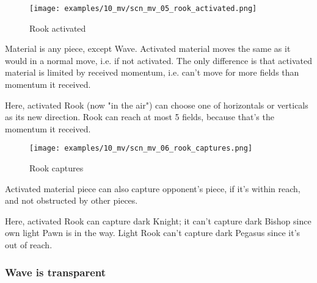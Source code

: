 \clearpage %

\vspace*{-2.1\baselineskip}
\noindent
\begin{figure}[!h]
\texttt{[image: examples/10\_mv/scn\_mv\_05\_rook\_activated.png]}
\vspace*{-1.3\baselineskip}
\caption{Rook activated}
\label{fig:scn_mv_05_rook_activated}
\end{figure}

\vspace*{-0.3\baselineskip}
Material is any piece, except Wave. Activated material moves the same as it would
in a normal move, i.e. if not activated. The only difference is that activated
material is limited by received momentum, i.e. can't move for more fields than
momentum it received.

Here, activated Rook (now "in the air") can choose one of horizontals or verticals
as its new direction. Rook can reach at most 5 fields, because that's the momentum
it received.

\clearpage %

\vspace*{-2.1\baselineskip}
\noindent
\begin{figure}[!h]
\texttt{[image: examples/10\_mv/scn\_mv\_06\_rook\_captures.png]}
\caption{Rook captures}
\label{fig:scn_mv_06_rook_captures}
\end{figure}

Activated material piece can also capture opponent's piece, if it's within reach,
and not obstructed by other pieces.

Here, activated Rook can capture dark Knight; it can't capture dark Bishop since
own light Pawn is in the way. Light Rook can't capture dark Pegasus since it's out
of reach.

\clearpage %

\subsubsection*{Wave is transparent}
\label{sec:Miranda's veil/Wave/Cascading Waves/Wave is transparent}

